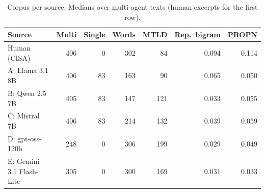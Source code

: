 \begin{table}[t]
\centering
\footnotesize
\caption{Corpus per source. Medians over multi-agent texts (human excerpts for the first row).}
\label{tab:data}
\begin{tabular}{lrrrrrr}
\toprule
Source & Multi & Single & Words & MTLD & Rep.\ bigram & PROPN \\
\midrule
Human (CISA) & 406 & 0 & 302 & 84 & 0.094 & 0.114 \\
A: Llama 3.1 8B & 406 & 83 & 163 & 90 & 0.065 & 0.050 \\
B: Qwen 2.5 7B & 405 & 83 & 147 & 121 & 0.033 & 0.055 \\
C: Mistral 7B & 406 & 83 & 214 & 132 & 0.039 & 0.059 \\
D: gpt-oss-120b & 248 & 0 & 306 & 199 & 0.029 & 0.049 \\
E: Gemini 3.1 Flash-Lite & 305 & 0 & 300 & 169 & 0.031 & 0.033 \\
\bottomrule
\end{tabular}
\end{table}
